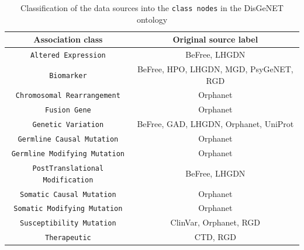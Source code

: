 \begin{table}[H]
    \centering
    \begin{tabular}{c|c}
    Association class & Original source label \\
    \hline
    
    \texttt{Altered Expression} & BeFree, LHGDN \\
    \texttt{Biomarker} & BeFree, HPO, LHGDN, MGD, PsyGeNET, RGD \\
    \texttt{Chromosomal Rearrangement} & Orphanet \\
    \texttt{Fusion Gene} & Orphanet \\
    \texttt{Genetic Variation} & BeFree, GAD, LHGDN, Orphanet, UniProt \\
    \texttt{Germline Causal Mutation} & Orphanet \\
    \texttt{Germline Modifying Mutation} & Orphanet \\
    \texttt{PostTranslational Modification} & BeFree, LHGDN \\
    \texttt{Somatic Causal Mutation} & Orphanet \\
    \texttt{Somatic Modifying Mutation} & Orphanet \\
    \texttt{Susceptibility Mutation} & ClinVar, Orphanet, RGD \\
    \texttt{Therapeutic} & CTD, RGD
    \end{tabular}
    \caption{Classification of the data sources into the \texttt{class nodes} in the DisGeNET ontology}
    \label{tab:disgenet_ontology}
\end{table}
